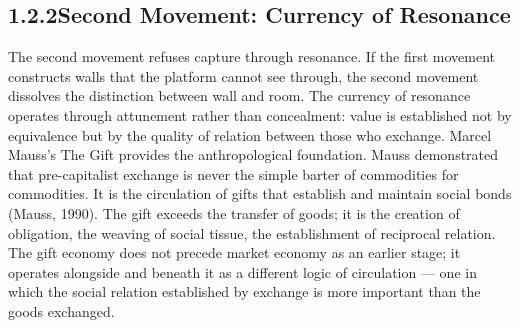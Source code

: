 \subsection{1.2.2\quad Second Movement: Currency of Resonance}

The second movement refuses capture through resonance. If the first movement constructs walls that the platform cannot see through, the second movement dissolves the distinction between wall and room. The currency of resonance operates through attunement rather than concealment: value is established not by equivalence but by the quality of relation between those who exchange. Marcel Mauss’s The Gift provides the anthropological foundation. Mauss demonstrated that pre-capitalist exchange is never the simple barter of commodities for commodities. It is the circulation of gifts that establish and maintain social bonds (Mauss, 1990). The gift exceeds the transfer of goods; it is the creation of obligation, the weaving of social tissue, the establishment of reciprocal relation. The gift economy does not precede market economy as an earlier stage; it operates alongside and beneath it as a different logic of circulation — one in which the social relation established by exchange is more important than the goods exchanged.

